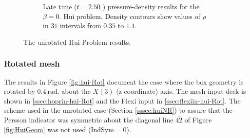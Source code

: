 \begin{figure}[h!]
\begin{subfigure}[h!]{0.4\linewidth}
\caption{Late time ($t = 2.50$ ) pressure-density results for the $\beta = 0.$ Hui problem. Density contours show values of $\rho$ in $31$ intervals from $0.35$ to $1.1$.}
  \label{fig:hui-Rot0-250}
\end{subfigure}
\caption{The unrotated Hui Problem results.}
\label{fig:hui-Rot0}
\end{figure}

\subsubsection{Rotated mesh}\label{sssec:huiRot}

The results in Figure \ref{fig:hui-Rot} document the case where the box geometry is rotated by $0.4 \ \mathrm{rad}.$ about the $X(3)$ (z coordinate) axis.  The mesh input deck is shown in \ref{ssec:hoprin-hui-Rot} and the Flexi input in \ref{ssec:flexiin-hui-Rot}. The scheme used in the unrotated case (Section \ref{sssec:huiNR})  to assure that the Persson indicator was symmetric about the diagonal line $\overline{42}$ of Figure \ref{fig:HuiGeom} was not used ($\mathrm{IndSym} = 0$).

